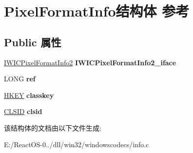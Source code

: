 \hypertarget{struct_pixel_format_info}{}\section{Pixel\+Format\+Info结构体 参考}
\label{struct_pixel_format_info}
\subsection*{Public 属性}
\begin{DoxyCompactItemize}
\item 
\mbox{\label{struct_pixel_format_info_ae911fc89153445332821ec4791abd293}} 
\hyperlink{interface_i_w_i_c_pixel_format_info2}{I\+W\+I\+C\+Pixel\+Format\+Info2} {\bfseries I\+W\+I\+C\+Pixel\+Format\+Info2\+\_\+iface}
\item 
\mbox{\label{struct_pixel_format_info_a2ba84298f1eccf26cf4ff36996ea6716}} 
L\+O\+NG {\bfseries ref}
\item 
\mbox{\label{struct_pixel_format_info_abb36da52d7a952898f239178d6157ddc}} 
\hyperlink{interfacevoid}{H\+K\+EY} {\bfseries classkey}
\item 
\mbox{\label{struct_pixel_format_info_aca4a9498eb57508055c4ab1ee2870aee}} 
\hyperlink{struct___i_i_d}{C\+L\+S\+ID} {\bfseries clsid}
\end{DoxyCompactItemize}


该结构体的文档由以下文件生成\+:\begin{DoxyCompactItemize}
\item 
E\+:/\+React\+O\+S-\/0../dll/win32/windowscodecs/info.\+c\end{DoxyCompactItemize}
